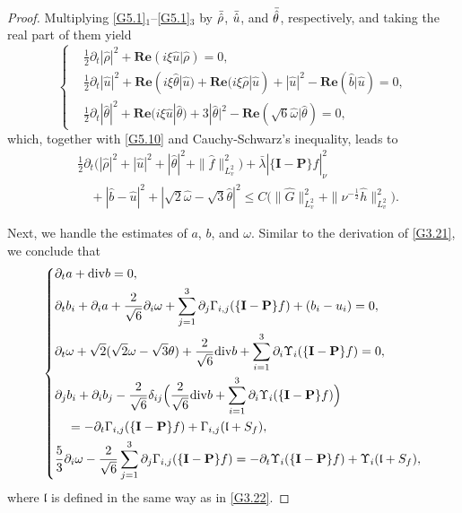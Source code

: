 \documentclass[reqno,11pt]{amsart}
\theoremstyle{plain}
\numberwithin{equation}{section}
\begin{document}
\begin{proof}
Multiplying \eqref{G5.1}$_1$--\eqref{G5.1}$_3$ by $\Bar{\hat{\rho}}$, $\Bar{\hat{u}}$, and $\Bar{\hat{\theta}}$, respectively, and taking the real part of them yield   
\begin{equation*} \left\{
\begin{aligned}
&\frac{1}{2} \partial_t|\hat{\rho}|^2+\mathbf{Re}( i \xi \hat{u}|\hat{\rho})=0, \\
 &\frac{1}{2} \partial_t|\hat{u}|^2+\mathbf{Re}( i \xi \hat{\theta}|\hat{u})+\mathbf{Re}( i \xi \hat{\rho}| \hat{u})+|\hat{u}|^2 -\mathbf{Re}(\hat{b}| \hat{u})=0,\\
& \frac{1}{2} \partial_t|\hat{\theta}|^2+\mathbf{Re}( i \xi \hat{u}| \hat{\theta})+3|\hat{\theta}|^2-\mathbf{Re}(\sqrt{6} \hat{\omega}|\hat{\theta})=0,
 \end{aligned}\right.
\end{equation*}
which, together with \eqref{G5.10} and   Cauchy-Schwarz's inequality, leads to
\begin{align}\label{G5.11}
& \frac{1}{2} \partial_t\big(|\hat{\rho}|^2
+|\hat{u}|^2+|\hat{\theta}|^2+\|\hat{f}\|_{L_v^2}^2\big)+\bar\lambda|\{\mathbf{I}-\mathbf{P}\} \hat{f}|_\nu^2
  \nonumber\\
&\quad+|\hat{b}-\hat{u}|^2+|\sqrt{2} \hat{\omega}-\sqrt{3} \hat{\theta}|^2\leq  C\big(\|\hat{G}\|_{L_v^2}^2+\|\nu^{-\frac{1}{2}} \hat{h}\|_{L_v^2}^2\big).
\end{align}

Next, we handle the estimates of $a$, $b$, and $\omega$. Similar to the derivation of \eqref{G3.21}, we conclude that
\begin{equation*} \left\{
\begin{aligned}
& \partial_t a+{\rm div}   b=0, \\
& \partial_t b_i+\partial_i a+\frac{2}{\sqrt{6}} 
\partial_i \omega+\sum_{j=1}^3 \partial_{j} \Gamma_{i, j}(\{\mathbf{I}-\mathbf{P}\} f)+(b_i-u_i)=0, \\
& \partial_t \omega+\sqrt{2}(\sqrt{2} \omega-\sqrt{3} \theta)
+\frac{2}{\sqrt{6}} {\rm div}  b+\sum_{i=1}^3 \partial_{i} \Upsilon_i(\{\mathbf{I}-\mathbf{P}\} f)=0, \\
& \partial_j b_i+\partial_i b_j-\frac{2}{\sqrt{6}} \delta_{i j}
\Big(\frac{2}{\sqrt{6}} {\rm div}   b+\sum_{i=1}^3 \partial_{ i} 
\Upsilon_i(\{\mathbf{I}-\mathbf{P}\} f)\Big)\\
&\quad =-\partial_t \Gamma_{i, j}(\{\mathbf{I}-\mathbf{P}\} f)
+\Gamma_{i, j} (\mathfrak{l}+{S}_f ), \\
& \frac{5}{3} \partial_i \omega-\frac{2}{\sqrt{6}} \sum_{j=1}^3 \partial_{j} 
\Gamma_{i, j}(\{\mathbf{I}-\mathbf{P}\} f)
=-\partial_t \Upsilon_i(\{\mathbf{I}-\mathbf{P}\} f)+\Upsilon_i(\mathfrak{l}+ {S}_f ),
\end{aligned}\right.
\end{equation*}
where $\mathfrak{l}$ is defined in the same way as   in \eqref{G3.22}.


\end{proof}
\end{document}
